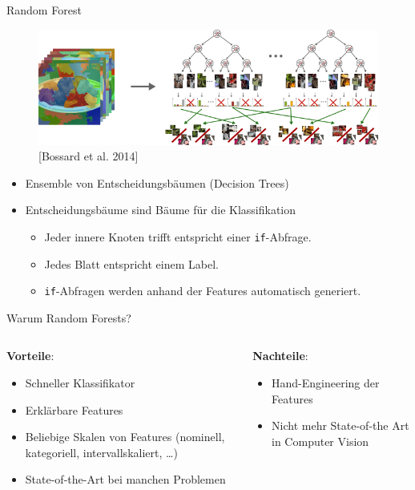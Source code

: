 \begin{frame}{Random Forest}
    \begin{figure}[ht]
        \centering
        \includegraphics[width=\textwidth]{../images/rf-comp-mining.png}
        \caption{[Bossard et al. 2014]}
        \label{fig:input}
    \end{figure}

    \begin{itemize}[<+->]
        \item Ensemble von Entscheidungsbäumen (Decision Trees)
        \item Entscheidungsbäume sind Bäume für die Klassifikation
        \begin{itemize}
            \item Jeder innere Knoten trifft entspricht einer \texttt{if}-Abfrage.
            \item Jedes Blatt entspricht einem Label.
            \item \texttt{if}-Abfragen werden anhand der Features automatisch
                  generiert.
        \end{itemize}
    \end{itemize}
\end{frame}

\begin{frame}{Warum Random Forests?}
    \begin{columns}[t,onlytextwidth]
        \begin{column}{0.5\textwidth}
            \textbf{Vorteile}:
            \begin{itemize}
                \item Schneller Klassifikator
                \item Erklärbare Features
                \item Beliebige Skalen von Features (nominell, kategoriell, intervallskaliert, \dots)
                \item State-of-the-Art bei manchen Problemen
            \end{itemize}
        \end{column}
        \begin{column}{0.5\textwidth}
            \textbf{Nachteile}:
            \begin{itemize}
                \item Hand-Engineering der Features
                \item Nicht mehr State-of-the Art in Computer Vision
            \end{itemize}
        \end{column}
    \end{columns}
\end{frame}

